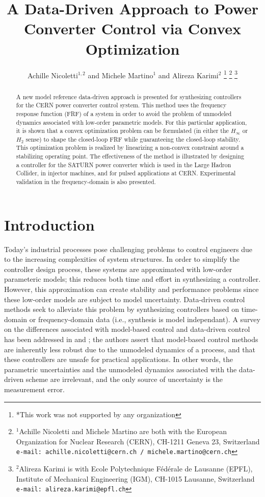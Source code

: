 \documentclass[a4paper, 10pt, conference]{ieeeconf}
\title{A Data-Driven Approach to Power Converter Control via Convex Optimization}
\author{Achille Nicoletti$^{1,2}$ and Michele Martino$^{1}$ and Alireza Karimi$^{2}$%
\thanks{*This work was not supported by any organization}%
\thanks{$^{1}$Achille Nicoletti and Michele Martino are both with the European Organization for Nuclear Research (CERN), 
 CH-1211 Geneva 23, Switzerland
        {\tt\small  e-mail: achille.nicoletti@cern.ch / michele.martino@cern.ch}}%
\thanks{$^{2}$Alireza Karimi is with Ecole Polytechnique F\'{e}d\'{e}rale de Lausanne (EPFL), Institute of Mechanical Engineering (IGM),
   CH-1015 Lausanne, Switzerland
        {\tt\small e-mail: alireza.karimi@epfl.ch}}%
}
\begin{document}
\maketitle
\thispagestyle{empty}
\pagestyle{empty}

\begin{abstract}                %
A new model reference data-driven approach is presented for synthesizing controllers for the CERN power converter control system. This method uses the frequency response function (FRF) of a system in order to avoid the problem of unmodeled dynamics associated with low-order parametric models. For this particular application, it is shown that a convex optimization problem can be formulated (in either the $H_\infty$ or $H_2$ sense) to shape the closed-loop FRF while guaranteeing the closed-loop stability. This optimization problem is realized by linearizing a non-convex constraint around a stabilizing operating point. The effectiveness of the method is illustrated by designing a controller for the SATURN power converter which is used in the Large Hadron Collider, in injector machines, and for pulsed applications at CERN. Experimental validation in the frequency-domain is also presented. 
\end{abstract}


\section{Introduction}
Today's industrial processes pose challenging problems to control engineers due to the increasing complexities of system structures. In order to simplify the controller design process, these systems are approximated with low-order parameteric models; this reduces both time and effort in synthesizing a controller. However, this approximation can create stability and performance problems since these low-order models are subject to model uncertainty. Data-driven control methods seek to alleviate this problem by synthesizing controllers based on time-domain or frequency-domain data (i.e., synthesis is model independant). A survey on the differences associated with model-based control and data-driven control has been addressed in \cite{HW13} and \cite{FK13a}; the authors assert that model-based control methods are inherently less robust due to the unmodeled dynamics of a process, and that these controllers are unsafe for practical applications. In other words, the parametric uncertainties and the unmodeled dynamics associated with the data-driven scheme are irrelevant, and the only source of uncertainty is the measurement error. 
\end{document}
